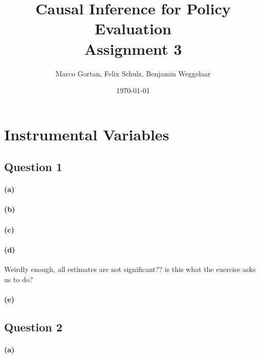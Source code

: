 \documentclass{scrartcl}
\title{Causal Inference for Policy Evaluation\\
\Large{Assignment 3}}
\author{Marco Gortan, Felix Schulz, Benjamin Weggelaar}
\date{\today}
\begin{document}
\maketitle

\section*{Instrumental Variables}

\subsection*{Question 1}

\paragraph*{(a)}



\paragraph*{(b)}

\paragraph*{(c)}

\paragraph*{(d)}

Weirdly enough, all estimates are not significant?? is this what the exercise asks us to do?

\paragraph*{(e)}

\subsection*{Question 2}

\paragraph*{(a)}
\end{document}
